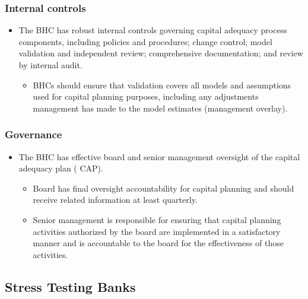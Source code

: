 \subsubsection{Internal controls}
\begin{itemize}
\item The BHC has robust internal controls governing capital adequacy process components, including policies and procedures; change control; model validation and independent review; comprehensive documentation; and review by internal audit.
    \begin{itemize}
    \item BHCs should ensure that validation covers all models and assumptions used for capital planning purposes, including any adjustments management has made to the model estimates (management overlay).
    \end{itemize}
\end{itemize}



\subsubsection{Governance}
\begin{itemize}
\item The BHC has effective board and senior management oversight of the capital adequacy plan ( CAP).
    \begin{itemize}
    \item Board has final oversight accountability for capital planning and should receive related information at least quarterly.
    \item Senior management is responsible for ensuring that capital planning activities authorized by the board are implemented in a satisfactory manner and is accountable to the board for the effectiveness of those activities.
    \end{itemize}
\end{itemize}



\subsection{Stress Testing Banks}


